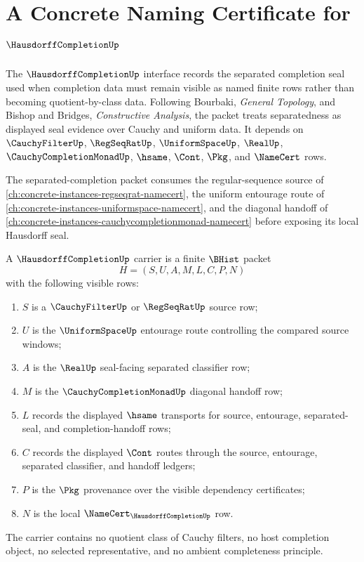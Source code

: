 \chapter{A Concrete Naming Certificate for $\HausdorffCompletionUp$}
\label{ch:concrete-instances-hausdorffcompletion-namecert}

The $\HausdorffCompletionUp$ interface records the separated completion seal used when completion data must remain visible as named finite rows rather than becoming quotient-by-class data. Following Bourbaki, \emph{General Topology}, and Bishop and Bridges, \emph{Constructive Analysis}, the packet treats separatedness as displayed seal evidence over Cauchy and uniform data. It depends on $\CauchyFilterUp$, $\RegSeqRatUp$, $\UniformSpaceUp$, $\RealUp$, $\CauchyCompletionMonadUp$, $\hsame$, $\Cont$, $\Pkg$, and $\NameCert$ rows.

The separated-completion packet consumes the regular-sequence source of \autoref{ch:concrete-instances-regseqrat-namecert}, the uniform entourage route of \autoref{ch:concrete-instances-uniformspace-namecert}, and the diagonal handoff of \autoref{ch:concrete-instances-cauchycompletionmonad-namecert} before exposing its local Hausdorff seal.

\begin{definition}
\label{def:hausdorff-completion-carrier}
A $\HausdorffCompletionUp$ carrier is a finite $\BHist$ packet
$$
H=(S,U,A,M,L,C,P,N)
$$
with the following visible rows:
\begin{enumerate}
\item $S$ is a $\CauchyFilterUp$ or $\RegSeqRatUp$ source row;
\item $U$ is the $\UniformSpaceUp$ entourage route controlling the compared source windows;
\item $A$ is the $\RealUp$ seal-facing separated classifier row;
\item $M$ is the $\CauchyCompletionMonadUp$ diagonal handoff row;
\item $L$ records the displayed $\hsame$ transports for source, entourage, separated-seal, and completion-handoff rows;
\item $C$ records the displayed $\Cont$ routes through the source, entourage, separated classifier, and handoff ledgers;
\item $P$ is the $\Pkg$ provenance over the visible dependency certificates;
\item $N$ is the local $\NameCert_{\HausdorffCompletionUp}$ row.
\end{enumerate}
The carrier contains no quotient class of Cauchy filters, no host completion object, no selected representative, and no ambient completeness principle.
\end{definition}

